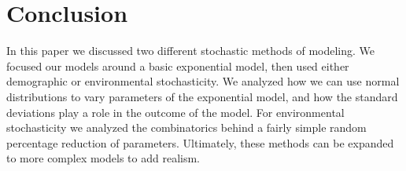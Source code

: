 \documentclass{article}
\begin{document}
\section{Conclusion}

In this paper we discussed two different stochastic methods of modeling. We focused our models around a basic exponential model, then used either demographic or environmental stochasticity. We analyzed how we can use normal distributions to vary parameters of the exponential model, and how the standard deviations play a role in the outcome of the model. For environmental stochasticity we analyzed the combinatorics behind a fairly simple random percentage reduction of parameters. Ultimately, these methods can be expanded to more complex models to add realism.
\end{document}
